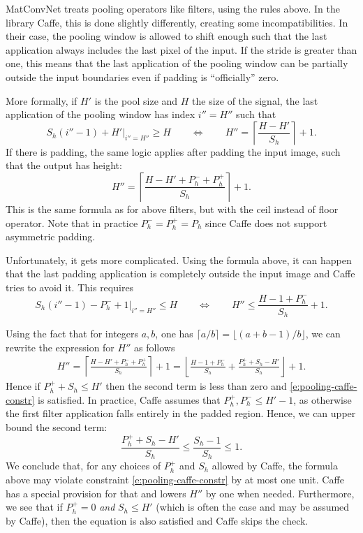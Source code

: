 MatConvNet treats pooling operators like filters, using the rules above. In the library Caffe, this is done slightly differently, creating some incompatibilities. In their case, the pooling window is allowed to shift enough such that the last application always includes the last pixel of the input. If the stride is greater than one, this means that the last application of the pooling window can be partially outside the input boundaries even if padding is ``officially'' zero.

More formally, if $H'$ is the pool size and $H$ the size of the signal, the last application of the pooling window has index $i'' = H''$ such that
\[
  S_h(i''-1) + H' \big|_{i''= H''} \geq H
  \qquad
  \Leftrightarrow
  \qquad
  H'' = \left\lceil 
  \frac{H - H'}{S_h}
  \right\rceil
  + 1.
\]
If there is padding, the same logic applies after padding the input image, such that the output has height:
\[
H'' = \left\lceil 
  \frac{H - H' + P_h^- + P_h^+}{S_h}
  \right\rceil
  + 1.
\]
This is the same formula as for above filters, but with the ceil instead of floor operator. Note that in practice $P_h^- = P_h^+ = P_h$ since Caffe does not support asymmetric padding. 

Unfortunately, it gets more complicated. Using the formula above, it can happen that the last padding application is completely outside the input image and Caffe tries to avoid it. This requires
\begin{equation}\label{e:pooling-caffe-constr}
  S_h(i'' - 1) - P_h^- + 1 \big|_{i''= H''} \leq H
  \qquad
  \Leftrightarrow
  \qquad
  H'' \leq \frac{H - 1 + P_h^-}{S_h} + 1.	
\end{equation}

Using the fact that for integers $a,b$, one has $\lceil a/b \rceil = \lfloor (a+b-1)/b \rfloor$, we can rewrite the expression for $H''$ as follows
\begin{align*}
H'' = \left\lceil 
  \frac{H - H' + P_h^- + P_h^+}{S_h}
  \right\rceil
  + 1
  =
  \left\lfloor
  \frac{H - 1 +P_h^-}{S_h}
  +
  \frac{P^+_h + S_h - H'}{S_h}
  \right\rfloor
  +1.
 \end{align*}
Hence if $P_h^+ +  S_h \leq H' $ then the second term is less than zero and \eqref{e:pooling-caffe-constr} is satisfied. In practice, Caffe assumes that $P_h^+, P_h^- \leq H' -1$, as otherwise the first filter application falls entirely in the padded region.  Hence, we can upper bound the second term:
\[
\frac{P^+_h + S_h - H'}{S_h}
\leq
\frac{S_h - 1}{S_h}
\leq
1.
\]
We conclude that, for any choices of $P_h^+$ and $S_h$ allowed by Caffe, the formula above may violate constraint \eqref{e:pooling-caffe-constr} by at most one unit. Caffe has a special provision for that and lowers $H''$ by one when needed. Furthermore, we see that if $P_h^+=0$ \emph{and} $S_h \leq H'$ (which is often the case and may be assumed by Caffe), then the equation is also satisfied and Caffe skips the check.


